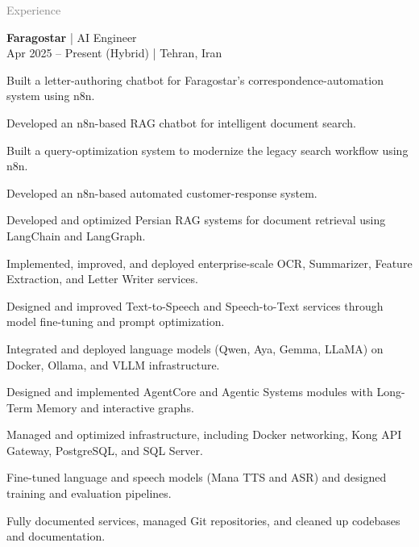 \documentclass[a4paper]{deedy-resume}
\begin{document}
\begin{minipage}[t]{0.62\textwidth}
\small
\textcolor{gray}{\huge{Experience}}
\vspace{\topsep}

\textbf{Faragostar} | AI Engineer \\
\vspace{\itemsep}
Apr 2025 – Present (Hybrid) | Tehran, Iran
\begin{tightitemize}
\item Built a letter-authoring chatbot for Faragostar's correspondence-automation system using n8n.
\item Developed an n8n-based RAG chatbot for intelligent document search.
\item Built a query-optimization system to modernize the legacy search workflow using n8n.
\item Developed an n8n-based automated customer-response system.
\item Developed and optimized Persian RAG systems for document retrieval using LangChain and LangGraph.
\item Implemented, improved, and deployed enterprise-scale OCR, Summarizer, Feature Extraction, and Letter Writer services.
\item Designed and improved Text-to-Speech and Speech-to-Text services through model fine-tuning and prompt optimization.
\item Integrated and deployed language models (Qwen, Aya, Gemma, LLaMA) on Docker, Ollama, and VLLM infrastructure.
\item Designed and implemented AgentCore and Agentic Systems modules with Long-Term Memory and interactive graphs.
\item Managed and optimized infrastructure, including Docker networking, Kong API Gateway, PostgreSQL, and SQL Server.
\item Fine-tuned language and speech models (Mana TTS and ASR) and designed training and evaluation pipelines.
\item Fully documented services, managed Git repositories, and cleaned up codebases and documentation.
\end{tightitemize}
\vspace{\topsep}

\colorbox{black}{} \\
\vspace{\itemsep}
\colorbox{black}{} \\
\colorbox{black}{} \\
\vspace{\topsep}


\end{minipage}
\end{document}
